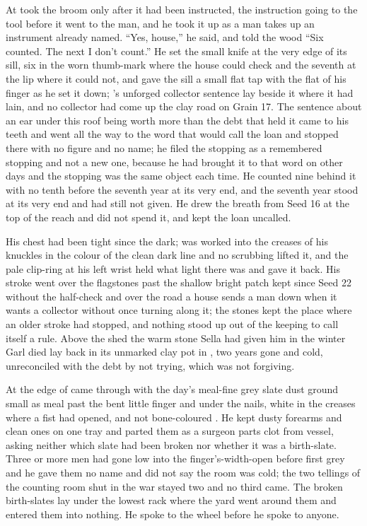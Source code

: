 \scenebreak

At   took the broom only after it had been instructed, the instruction going to the tool before it went to the man, and he took it up as a man takes up an instrument already named. “Yes, house,” he said, and told the wood “Six counted. The next I don't count.” He set the small knife at the very edge of its sill, six in the worn thumb-mark where the house could check and the seventh at the lip where it could not, and gave the sill a small flat tap with the flat of his finger as he set it down; 's unforged collector sentence lay beside it where it had lain, and no collector had come up the clay road on Grain 17. The sentence about an ear under this roof being worth more than the debt that held it came to his teeth and went all the way to the word that would call the loan and stopped there with no figure and no name; he filed the stopping as a remembered stopping and not a new one, because he had brought it to that word on other days and the stopping was the same object each time. He counted nine behind it with no tenth before the seventh year at its very end, and the seventh year stood at its very end and had still not given. He drew the breath from Seed 16 at the top of the reach and did not spend it, and kept the loan uncalled.

His chest had been tight since the dark;  was worked into the creases of his knuckles in the colour of the clean dark line and no scrubbing lifted it, and the pale clip-ring at his left wrist held what light there was and gave it back. His stroke went over the flagstones past the shallow bright patch kept since Seed 22 without the half-check and over the road a house sends a man down when it wants a collector without once turning along it; the stones kept the place where an older stroke had stopped, and nothing stood up out of the keeping to call itself a rule. Above the shed the warm stone Sella had given him in the winter Garl died lay back in its unmarked clay pot in , two years gone and cold, unreconciled with the debt by not trying, which was not forgiving.

\scenebreak

At the edge of   came through with the day's meal-fine grey slate dust ground small as meal past the bent little finger and under the nails, white in the creases where a fist had opened, and not bone-coloured . He kept dusty forearms and clean ones on one tray and parted them as a surgeon parts clot from vessel, asking neither which slate had been broken nor whether it was a birth-slate. Three or more men had gone low into the finger's-width-open  before first grey and he gave them no name and did not say the room was cold; the two tellings of the counting room shut in the war stayed two and no third came. The broken birth-slates lay under the lowest rack where the yard went around them and entered them into nothing. He spoke to the wheel before he spoke to anyone.

